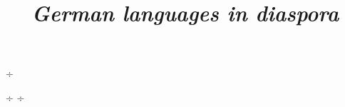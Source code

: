 ÷\documentclass[output=paper]{langscibook}
\author{ }
\title{\textbf{\textit{German languages in diaspora}}}
\begin{document}
\maketitle

 ÷
 ÷

\end{document}

